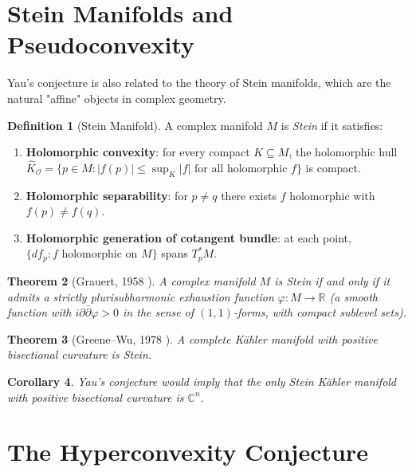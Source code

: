 \documentclass[12pt,a4paper]{amsart}
\newtheorem{theorem}{Theorem}[section]
\newtheorem{corollary}[theorem]{Corollary}
\theoremstyle{definition}
\newtheorem{definition}[theorem]{Definition}
\theoremstyle{remark}
\newcommand{\CC}{\mathbb{C}}
\newcommand{\RR}{\mathbb{R}}
\newcommand{\dd}{\partial}
\newcommand{\OO}{\mathcal{O}}
\begin{document}
\section{Stein Manifolds and Pseudoconvexity}

Yau's conjecture is also related to the theory of Stein manifolds, which are
the natural "affine" objects in complex geometry.

\begin{definition}[Stein Manifold]
A complex manifold $M$ is \emph{Stein} if it satisfies:
\begin{enumerate}[label=(\roman*)]
  \item \textbf{Holomorphic convexity}: for every compact $K \subseteq M$,
        the holomorphic hull $\hat K_\OO = \{p \in M : |f(p)| \le \sup_K |f|
        \text{ for all holomorphic } f\}$ is compact.
  \item \textbf{Holomorphic separability}: for $p \neq q$ there exists $f$
        holomorphic with $f(p) \neq f(q)$.
  \item \textbf{Holomorphic generation of cotangent bundle}: at each point,
        $\{df_p : f \text{ holomorphic on } M\}$ spans $T^*_p M$.
\end{enumerate}
\end{definition}

\begin{theorem}[Grauert, 1958 \cite{Grauert1958}]
A complex manifold $M$ is Stein if and only if it admits a strictly
plurisubharmonic exhaustion function $\varphi \colon M \to \RR$ (a smooth
function with $i\dd\bar\dd\varphi > 0$ in the sense of $(1,1)$-forms,
with compact sublevel sets).
\end{theorem}

\begin{theorem}[Greene--Wu, 1978 \cite{GreeneWu1978}]
A complete Kähler manifold with positive bisectional curvature is Stein.
\end{theorem}

\begin{corollary}
Yau's conjecture would imply that the only Stein Kähler manifold with
positive bisectional curvature is $\CC^n$.
\end{corollary}

\section{The Hyperconvexity Conjecture}
\end{document}
